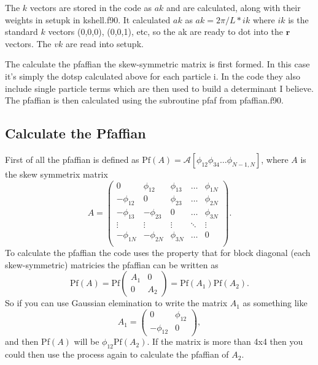 The $k$ vectors are stored in the code as $ak$ and are calculated, along with their weights in setupk in kshell.f90. It calculated $ak$ as $ak=2\pi/L*ik$ where $ik$ is the standard $k$ vectors (0,0,0), (0,0,1), etc, so the ak are ready to dot into the $\mathbf{r}$ vectors. The $vk$ are read into setupk.

The calculate the pfaffian the skew-symmetric matrix is first formed. In this case it's simply the dotsp calculated above for each particle i. In the code they also include single particle terms which are then used to build a determinant I believe. The pfaffian is then calculated using the subroutine pfaf from pfaffian.f90. 

\subsection{Calculate the Pfaffian}
First of all the pfaffian is defined as $\text{Pf}(A) = \mathcal{A}[\phi_{12}\phi_{34}\ldots\phi_{N-1,N}]$, where $A$ is the skew symmetrix matrix
\begin{equation}
   A = \begin{pmatrix} 
      0           &  \phi_{12}   &  \phi_{13}   &  \ldots   &  \phi_{1N} \\
      -\phi_{12}  &  0           &  \phi_{23}   &  \ldots   &  \phi_{2N} \\
      -\phi_{13}  &  -\phi_{23}  &  0           &  \ldots   &  \phi_{3N} \\
      \vdots      &  \vdots      &  \vdots      &  \ddots   &  \vdots    \\
      -\phi_{1N}  &  -\phi_{2N}  &  \phi_{3N}   &  \ldots   &  0         \\
\end{pmatrix}.
\end{equation}
To calculate the pfaffian the code uses the property that for block diagonal (each skew-symmetric) matricies the pfaffian can be written as
\begin{equation}
   \text{Pf}(A) = \text{Pf}\begin{pmatrix} 
      A_1   &  0 \\
      0     &  A_2
\end{pmatrix}
   = \text{Pf}(A_1)\text{Pf}(A_2).
\end{equation}
So if you can use Gaussian elemination to write the matrix $A_1$ as something like
\begin{equation}
   A_1 = \begin{pmatrix} 
      0           &  \phi_{12} \\
      -\phi_{12}  &  0
\end{pmatrix},
\end{equation}
and then Pf$(A)$ will be $\phi_{12}\text{Pf}(A_2)$. If the matrix is more than 4x4 then you could then use the process again to calculate the pfaffian of $A_2$.

